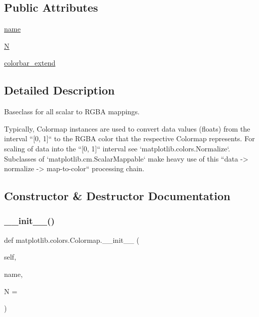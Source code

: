\subsection*{Public Attributes}
\begin{DoxyCompactItemize}
\item 
\hyperlink{classmatplotlib_1_1colors_1_1Colormap_aa816ba9aebc8d8438ca791c82bb6198c}{name}
\item 
\hyperlink{classmatplotlib_1_1colors_1_1Colormap_a011f75e2d28856dd18ada18febb2bb26}{N}
\item 
\hyperlink{classmatplotlib_1_1colors_1_1Colormap_ab6d5f011a6654b435e6ec4b369202353}{colorbar\+\_\+extend}
\end{DoxyCompactItemize}


\subsection{Detailed Description}
\begin{DoxyVerb}Baseclass for all scalar to RGBA mappings.

Typically, Colormap instances are used to convert data values (floats)
from the interval ``[0, 1]`` to the RGBA color that the respective
Colormap represents. For scaling of data into the ``[0, 1]`` interval see
`matplotlib.colors.Normalize`. Subclasses of `matplotlib.cm.ScalarMappable`
make heavy use of this ``data -> normalize -> map-to-color`` processing
chain.
\end{DoxyVerb}
 

\subsection{Constructor \& Destructor Documentation}
\mbox{\label{classmatplotlib_1_1colors_1_1Colormap_a7e05ab14cde241da5bfcacaed387ec5e}} 
\subsubsection{\texorpdfstring{\+\_\+\+\_\+init\+\_\+\+\_\+()}{\_\_init\_\_()}}
{\footnotesize\ttfamily def matplotlib.\+colors.\+Colormap.\+\_\+\+\_\+init\+\_\+\+\_\+ (\begin{DoxyParamCaption}\item[{}]{self,  }\item[{}]{name,  }\item[{}]{N = {} }\end{DoxyParamCaption})}

